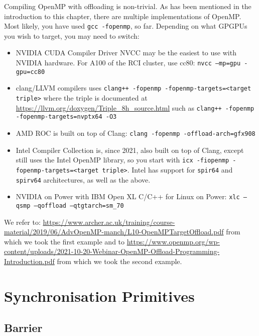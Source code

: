 Compiling OpenMP with offloading is non-trivial. As has been mentioned in the introduction to this chapter, there are multiple implementations of OpenMP. Most likely, you have used \verb|gcc -fopenmp|, so far. Depending on what GPGPUs you wish to target, you may need to switch:



\begin{itemize}
\item NVIDIA CUDA Compiler Driver NVCC may be the easiest to use with NVIDIA hardware. For A100 of the RCI cluster, use cc80: \verb|nvcc –mp=gpu -gpu=cc80|
\item clang/LLVM compilers uses \verb|clang++ -fopenmp -fopenmp-targets=<target triple>| where the triple is documented at \url{https://llvm.org/doxygen/Triple_8h_source.html} such as \verb|clang++ -fopenmp -fopenmp-targets=nvptx64 -O3|
\item AMD ROC is built on top of Clang: \verb|clang -fopenmp -offload-arch=gfx908|
\item Intel Compiler Collection is, since 2021, also built on top of Clang, except still uses the Intel OpenMP library, so you start with \verb|icx -fiopenmp -fopenmp-targets=<target triple>|. Intel has support for \verb|spir64| and \verb|spirv64| architectures, as well as the above.
\item NVIDIA on Power with IBM Open XL C/C++ for Linux on Power: \verb|xlc –qsmp –qoffload –qtgtarch=sm_70|
\end{itemize} 

We refer to:
\url{https://www.archer.ac.uk/training/course-material/2019/06/AdvOpenMP-manch/L10-OpenMPTargetOffload.pdf}
from which we took the first example and to \url{https://www.openmp.org/wp-content/uploads/2021-10-20-Webinar-OpenMP-Offload-Programming-Introduction.pdf} from which we took the second example. 

\section{Synchronisation Primitives}

\subsection{Barrier}

